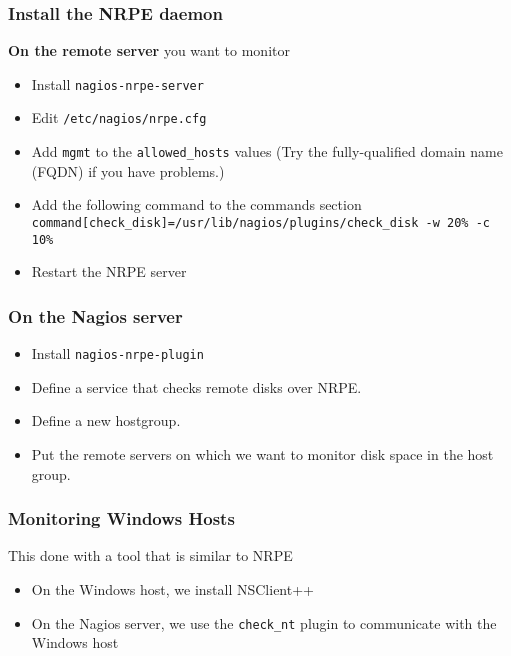 \documentclass[10pt]{beamer}
\begin{document}
\begin{frame}
  \frametitle{Install the NRPE daemon}

\textbf{On the remote server} you want to monitor
\begin{itemize}
  \item Install \texttt{nagios-nrpe-server}
  \item Edit \texttt{/etc/nagios/nrpe.cfg}
  \item Add \texttt{mgmt} to the \texttt{allowed\_hosts} values (Try the fully-qualified domain name (FQDN) if you have problems.)
  \item Add the following command to the commands section \\
   \texttt{command[check\_disk]=/usr/lib/nagios/plugins/check\_disk -w 20\% -c 10\%}

  \item Restart the NRPE server
\end{itemize}
\end{frame}

\begin{frame}
  \frametitle{On the Nagios server}

  \begin{itemize}
      \item Install \texttt{nagios-nrpe-plugin}
	  \item Define a service that checks remote disks over NRPE.
	  \item Define a new hostgroup.
	  \item Put the remote servers on which we want to monitor disk
		  space in the host group.
  \end{itemize}
\end{frame}
\begin{frame}
  \frametitle{Monitoring Windows Hosts}

This done with a tool that is similar to NRPE
\begin{itemize}
  \item On the Windows host, we install NSClient++
  \item On the Nagios server, we use the \texttt{check\_nt} plugin to communicate with
        the Windows host
\end{itemize}
\end{frame}
\end{document}
